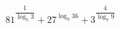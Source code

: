 \begin{ex}
	\begin{condition}
		\( 81^{\dfrac{1}{\log_5 3}}+27^{\log_9 36}+3^{\dfrac{4}{\log_7 9}} \)
	\end{condition}
\end{ex}